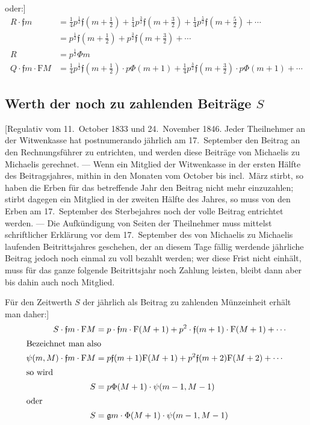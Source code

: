 \documentclass[12pt,a4paper]{article}
\begin{document}
oder:]
\begin{align}
R \cdot \mathfrak{f}m &= \tfrac{1}{4}p^{\frac{1}{2}}\mathfrak{f}(m+\tfrac{1}{2}) + \tfrac{1}{4}p^{\frac{3}{2}}\mathfrak{f}(m+\tfrac{3}{2}) + \tfrac{1}{4}p^{\frac{5}{2}}\mathfrak{f}(m+\tfrac{5}{2}) + \cdots \\
&= p^{\frac{1}{2}}\mathfrak{f}(m+\tfrac{1}{2}) + p^{\frac{3}{2}}\mathfrak{f}(m+\tfrac{3}{2}) + \cdots \\
R &= p^{\frac{1}{2}}\Phi m \\
Q \cdot \mathfrak{f}m \cdot \mathrm{F}M &= \tfrac{1}{4}p^{\frac{1}{2}}\mathfrak{f}(m+\tfrac{1}{2}) \cdot p\Phi(m+1) + \tfrac{1}{4}p^{\frac{3}{2}}\mathfrak{f}(m+\tfrac{3}{2}) \cdot p\Phi(m+1) + \cdots
\end{align}

\subsection*{Werth der noch zu zahlenden Beiträge $S$}

[Regulativ vom 11.~October 1833 und 24.~November 1846. Jeder Theilnehmer an der Witwenkasse hat postnumerando jährlich am 17.~September den Beitrag an den Rechnungsführer zu entrichten, und werden diese Beiträge von Michaelis zu Michaelis gerechnet. --- Wenn ein Mitglied der Witwenkasse in der ersten Hälfte des Beitragsjahres, mithin in den Monaten vom October bis incl.~März stirbt, so haben die Erben für das betreffende Jahr den Beitrag nicht mehr einzuzahlen; stirbt dagegen ein Mitglied in der zweiten Hälfte des Jahres, so muss von den Erben am 17.~September des Sterbejahres noch der volle Beitrag entrichtet werden. --- Die Aufkündigung von Seiten der Theilnehmer muss mittelst schriftlicher Erklärung vor dem 17.~September des von Michaelis zu Michaelis laufenden Beitrittsjahres geschehen, der an diesem Tage fällig werdende jährliche Beitrag jedoch noch einmal zu voll bezahlt werden; wer diese Frist nicht einhält, muss für das ganze folgende Beitrittsjahr noch Zahlung leisten, bleibt dann aber bis dahin auch noch Mitglied.

Für den Zeitwerth $S$ der jährlich als Beitrag zu zahlenden Münzeinheit erhält man daher:]
\begin{align}
S \cdot \mathfrak{f}m \cdot \mathrm{F}M &= p \cdot \mathfrak{f}m \cdot \mathrm{F}(M+1) + p^2 \cdot \mathfrak{f}(m+1) \cdot \mathrm{F}(M+1) + \cdots \\
\intertext{Bezeichnet man also}
\psi(m,M) \cdot \mathfrak{f}m \cdot \mathrm{F}M &= p\mathfrak{f}(m+1)\mathrm{F}(M+1) + p^2\mathfrak{f}(m+2)\mathrm{F}(M+2) + \cdots \\
\intertext{so wird}
S &= p\Phi(M+1) \cdot \psi(m-1, M-1) \\
\intertext{oder}
S &= \mathfrak{g}m \cdot \Phi(M+1) \cdot \psi(m-1, M-1)
\end{align}
\end{document}
